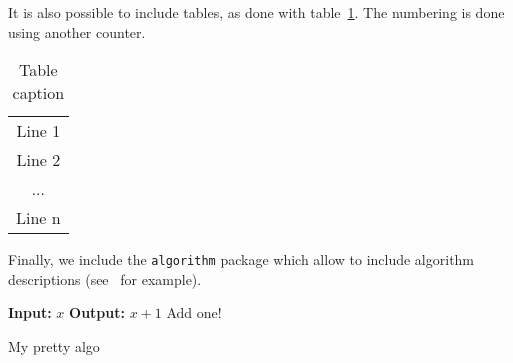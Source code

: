
It is also possible to include tables, as done with
table~\ref{tbl:myname}. The numbering is done using another counter.

\begin{table}[ht]
  \centering
  \begin{tabular}{|c|}
  \hline
  Line 1 \\
  Line 2 \\
  ... \\
  Line n \\
  \hline
  \end{tabular}
  \caption{Table caption}
  \label{tbl:myname}
\end{table}


Finally, we include the \texttt{algorithm} package which allow to
include algorithm descriptions (see~\cite{alg:monnom} for example).

\begin{algorithm}
\begin{algorithmic}[1]
  \Statex \textbf{Input:} $x$
  \Statex \textbf{Output:} $x+1$
  \State Add one!
\end{algorithmic}
\caption{My pretty algo}\label{alg:myname}
\end{algorithm}



%
%

